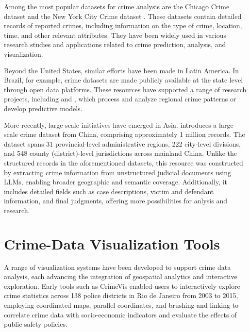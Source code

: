 Among the most popular datasets for crime analysis are the Chicago Crime dataset \citep{ChicagoDataset} and the New York City Crime dataset \citep{NYCDataset}. These datasets contain detailed records of reported crimes, including information on the type of crime, location, time, and other relevant attributes. They have been widely used in various research studies and applications related to crime prediction, analysis, and visualization.

Beyond the United States, similar efforts have been made in Latin America. In Brazil, for example, crime datasets are made publicly available at the state level through open data platforms. These resources have supported a range of research projects, including \citep{Garcia2022CriPAV} and \citep{Waqar2025CrimePredictionGNN}, which process and analyze regional crime patterns or develop predictive models.

More recently, large-scale initiatives have emerged in Asia. \citep{Zhang2025CrimeDatasetChina} introduces a large-scale crime dataset from China, comprising approximately 1 million records. The dataset spans 31 provincial-level administrative regions, 222 city-level divisions, and 548 county (district)-level jurisdictions across mainland China. Unlike the structured records in the aforementioned datasets, this resource was constructed by extracting crime information from unstructured judicial documents using LLMs, enabling broader geographic and semantic coverage. Additionally, it includes detailed fields such as case descriptions, victim and defendant information, and final judgments, offering more possibilities for anlysis and research.



\section{Crime-Data Visualization Tools}


A range of visualization systems have been developed to support crime data analysis, each advancing the integration of geospatial analytics and interactive exploration. Early tools such as CrimeVis \citep{Silva2017CrimeVisAI} enabled users to interactively explore crime statistics across 138 police districts in Rio de Janeiro from 2003 to 2015, employing coordinated maps, parallel coordinates, and brushing-and-linking to correlate crime data with socio-economic indicators and evaluate the effects of public-safety policies. 

